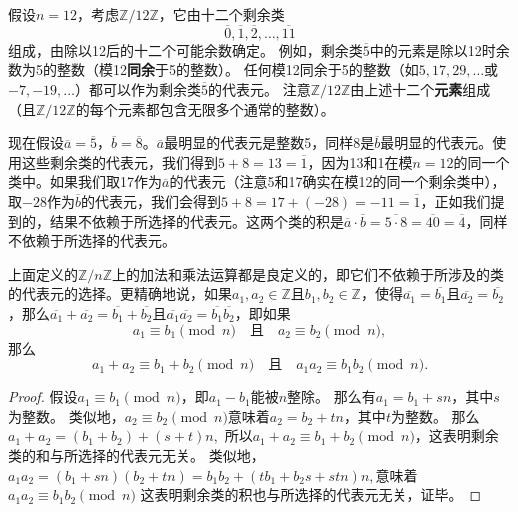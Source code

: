 \begin{example}
假设$n = 12$，考虑$\mathbb{Z}/12\mathbb{Z}$，它由十二个剩余类$$\overline{0}, \overline{1}, \overline{2}, \ldots, \overline{11}$$组成，由除以12后的十二个可能余数确定。
例如，剩余类$\overline{5}$中的元素是除以12时余数为5的整数（模12\textbf{同余}于5的整数）。
任何模12同余于5的整数（如$5, 17, 29, \ldots$或$-7, -19, \ldots$）都可以作为剩余类$\overline{5}$的代表元。
注意$\mathbb{Z}/12\mathbb{Z}$由上述十二个\textbf{元素}组成（且$\mathbb{Z}/12\mathbb{Z}$的每个元素都包含无限多个通常的整数）。

现在假设$\overline{a} = \overline{5}$，$\overline{b} = \overline{8}$。$\overline{a}$最明显的代表元是整数5，同样8是$\overline{b}$最明显的代表元。使用这些剩余类的代表元，我们得到$5 + 8 = 13 = \overline{1}$，因为13和1在模$n = 12$的同一个类中。如果我们取17作为$\overline{a}$的代表元（注意5和17确实在模12的同一个剩余类中），取$-28$作为$\overline{b}$的代表元，我们会得到$5 + 8 = 17 + (-28) = -11 = \overline{1}$，正如我们提到的，结果不依赖于所选择的代表元。这两个类的积是$\overline{a} \cdot \overline{b} = \overline{5 \cdot 8} = \overline{40} = \overline{4}$，同样不依赖于所选择的代表元。
\end{example}

\begin{theorem}
\label{thm:0.3.1}
上面定义的$\mathbb{Z}/n\mathbb{Z}$上的加法和乘法运算都是良定义的，即它们不依赖于所涉及的类的代表元的选择。更精确地说，如果$a_1, a_2 \in \mathbb{Z}$且$b_1, b_2 \in \mathbb{Z}$，使得$\overline{a_1} = \overline{b_1}$且$\overline{a_2} = \overline{b_2}$，那么$\overline{a_1} + \overline{a_2} = \overline{b_1} + \overline{b_2}$且$\overline{a_1}\overline{a_2} = \overline{b_1}\overline{b_2}$，即如果
\[
a_1 \equiv b_1 \pmod{n} \quad \text{且} \quad a_2 \equiv b_2 \pmod{n},
\]
那么
\[
a_1 + a_2 \equiv b_1 + b_2 \pmod{n} \quad \text{且} \quad a_1a_2 \equiv b_1b_2 \pmod{n}.
\]
\end{theorem}

\begin{proof}
假设$a_1 \equiv b_1 \pmod{n}$，即$a_1 - b_1$能被$n$整除。
那么有$a_1 = b_1 + sn$，其中$s$为整数。
类似地，$a_2 \equiv b_2 \pmod{n}$意味着$a_2 = b_2 + tn$，其中$t$为整数。
那么
$a_1 + a_2 = (b_1 + b_2) + (s + t)n,$
所以$a_1 + a_2 \equiv b_1 + b_2 \pmod{n}$，这表明剩余类的和与所选择的代表元无关。
类似地，$a_1a_2 = (b_1 + sn)(b_2 + tn) = b_1b_2 + (tb_1 + b_2s + stn)n,$意味着$a_1a_2 \equiv b_1b_2 \pmod{n}$
这表明剩余类的积也与所选择的代表元无关，证毕。
\end{proof}

